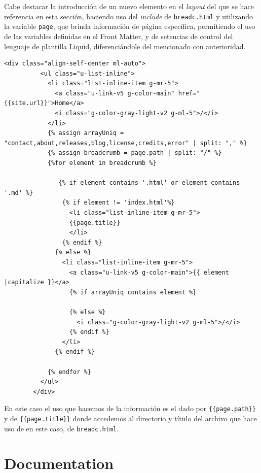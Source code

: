 Cabe destacar la introducción de un nuevo elemento en el \textit{layout} del que se hace referencia en esta sección, haciendo uso del \textit{include} de \texttt{breadc.html} y utilizando la variable \texttt{page}, que brinda información de página específica, permitiendo el uso de las variables definidas en el Front Matter, y de setencias de control del lenguaje de plantilla Liquid,  diferenciándole del mencionado con anterioridad. 

\begin{lstlisting}[style=htmlcssjs,caption=Breadcrumber,label={code:breadcrum}]
  <div class="align-self-center ml-auto">
          <ul class="u-list-inline">
            <li class="list-inline-item g-mr-5">
              <a class="u-link-v5 g-color-main" href="{{site.url}}">Home</a>
              <i class="g-color-gray-light-v2 g-ml-5">/</i>
            </li>
            {% assign arrayUniq = "contact,about,releases,blog,license,credits,error" | split: "," %}
            {% assign breadcrumb = page.path | split: "/" %}
            {%for element in breadcrumb %}

               {% if element contains '.html' or element contains '.md' %}
                {% if element != 'index.html'%}
                  <li class="list-inline-item g-mr-5">
                  {{page.title}}
                  </li>
                {% endif %}
              {% else %}
                <li class="list-inline-item g-mr-5">
                  <a class="u-link-v5 g-color-main">{{ element |capitalize }}</a>
                  {% if arrayUniq contains element %}

                  {% else %}
                    <i class="g-color-gray-light-v2 g-ml-5">/</i>
                  {% endif %}
                </li>
              {% endif %}

            {% endfor %}
          </ul>
        </div>
\end{lstlisting}

En este caso el uso que hacemos de la información es el dado por \texttt{\{\{page.path\}\}} y de \texttt{\{\{page.title\}\}} donde accedemos al directorio y título del archivo que hace uso de en este caso, de \texttt{breadc.html}.

\section{Documentation}
\label{sec:docWeb}

